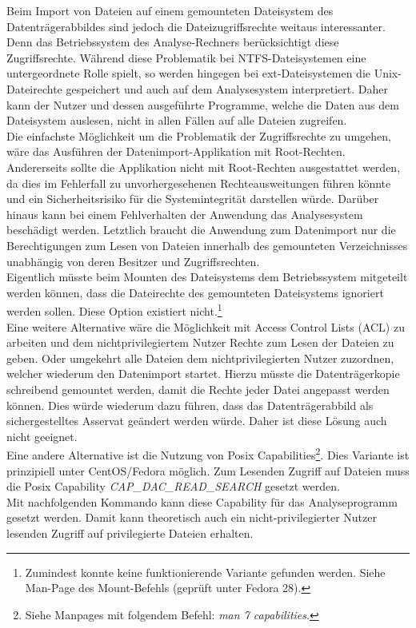 \noindent
Beim Import von Dateien auf einem gemounteten Dateisystem des Datenträgerabbildes sind jedoch die Dateizugriffsrechte weitaus interessanter. Denn das Betriebssystem des Analyse-Rechners berücksichtigt diese Zugriffsrechte. Während diese Problematik bei NTFS-Dateisystemen eine untergeordnete Rolle spielt, so werden hingegen bei ext-Dateisystemen die Unix-Dateirechte gespeichert und auch auf dem Analysesystem interpretiert. 
Daher kann der Nutzer und dessen ausgeführte Programme, welche die Daten aus dem Dateisystem auslesen, nicht in allen Fällen auf alle Dateien zugreifen.\\

\noindent
Die einfachste Möglichkeit um die Problematik der Zugriffsrechte zu umgehen, wäre das Ausführen der Datenimport-Applikation mit Root-Rechten. Andererseits sollte die Applikation nicht mit Root-Rechten ausgestattet werden, da dies im Fehlerfall zu unvorhergesehenen Rechteausweitungen führen könnte und ein Sicherheitsrisiko für die Systemintegrität darstellen würde. Darüber hinaus kann bei einem Fehlverhalten der Anwendung das Analysesystem beschädigt werden. Letztlich braucht die Anwendung zum Datenimport nur die Berechtigungen zum Lesen von Dateien innerhalb des gemounteten Verzeichnisses unabhängig von deren Besitzer und Zugriffsrechten.\\

\noindent
Eigentlich müsste beim Mounten des Dateisystems dem Betriebssystem mitgeteilt werden können, dass die Dateirechte des gemounteten Dateisystems ignoriert werden sollen. Diese Option existiert nicht.\footnote{Zumindest konnte keine funktionierende Variante gefunden werden. Siehe Man-Page des Mount-Befehls (geprüft unter Fedora 28).}\\
Eine weitere Alternative wäre die Möglichkeit mit Access Control Lists (ACL) zu arbeiten und dem nichtprivilegiertem Nutzer Rechte zum Lesen der Dateien zu geben. Oder umgekehrt alle Dateien dem nichtprivilegierten Nutzer zuzordnen, welcher wiederum den Datenimport startet.
Hierzu müsste die Datenträgerkopie schreibend gemountet werden, damit die Rechte jeder Datei angepasst werden können. Dies würde wiederum dazu führen, dass das Datenträgerabbild als sichergestelltes Asservat geändert werden würde. 
Daher ist diese Lösung auch nicht geeignet.\\

\noindent
Eine andere Alternative ist die Nutzung von Posix Capabilities\footnote{Siehe Manpages mit folgendem Befehl: \textit{ man 7 capabilities}.}. Dies Variante ist prinzipiell unter CentOS/Fedora möglich. Zum Lesenden Zugriff auf Dateien muss die Posix Capability \textit{CAP\_DAC\_READ\_SEARCH} gesetzt werden.\\
Mit nachfolgenden Kommando kann diese Capability für das Analyseprogramm gesetzt werden.
Damit kann theoretisch auch ein nicht-privilegierter Nutzer lesenden Zugriff auf privilegierte Dateien erhalten.\\ 

